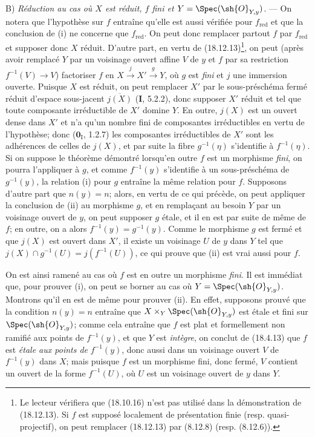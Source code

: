 B) \emph{Réduction au cas où $X$ est réduit, $f$ fini et $Y=\Spec(\sh{O}_{Y,y})$.} --- On notera que l'hypothèse sur $f$ entraîne qu'elle est aussi vérifiée pour $f_{\mathrm{red}}$ et que la conclusion de (i) ne concerne que $f_{\mathrm{red}}$. On peut donc remplacer partout $f$ par $f_{\mathrm{red}}$ et supposer donc $X$ réduit.
D'autre part, en vertu de (18.12.13)\footnote{Le lecteur vérifiera que (18.10.16) n'est pas utilisé dans la démonstration de (18.12.13). Si $f$ est supposé localement de présentation finie (resp. quasi-projectif), on peut remplacer (18.12.13) par (8.12.8) (resp. (8.12.6)).}, on peut (après avoir remplacé $Y$ par un voisinage ouvert affine $V$ de $y$ et $f$ par sa restriction $f^{-1}(V)\to V$) factoriser $f$ en $X\xrightarrow{j}X'\xrightarrow{g}Y$, où $g$ est \emph{fini} et $j$ une immersion ouverte. Puisque $X$ est réduit, on peut remplacer $X'$ par le sous-préschéma fermé réduit d'espace sous-jacent $\overline{j(X)}$ (\textbf{I}, 5.2.2), donc supposer $X'$ réduit et tel que toute composante irréductible de $X'$ domine $Y$. En outre, $j(X)$ est un ouvert dense dans $X'$ et n'a qu'un nombre fini de composantes irréductibles en vertu de l'hypothèse; donc ($\mathbf{0}_{\mathrm I}$, 1.2.7) les composantes irréductibles de $X'$ sont les adhérences de celles de $j(X)$, et par suite la fibre $g^{-1}(\eta)$ s'identifie à $f^{-1}(\eta)$. Si on suppose le théorème démontré lorsqu'en outre $f$ est un morphisme \emph{fini}, on pourra l'appliquer à $g$, et comme $f^{-1}(y)$ s'identifie à un sous-préschéma de $g^{-1}(y)$, la relation (i) pour $g$ entraîne la même relation pour $f$. Supposons d'autre part que $n(y)=n$; alors, en vertu de ce qui précède, on peut appliquer la conclusion de (ii) au morphisme $g$, et en remplaçant au besoin $Y$ par un voisinage ouvert de $y$, on peut supposer $g$ étale, et il en est par suite de même de $f$; en outre, on a alors $f^{-1}(y)=g^{-1}(y)$. Comme le morphisme $g$ est fermé et que $j(X)$ est ouvert dans $X'$, il existe un voisinage $U$ de $y$ dans $Y$ tel que $j(X)\cap g^{-1}(U)=j(f^{-1}(U))$, ce qui prouve que (ii) est vrai aussi pour $f$.

On est ainsi ramené au cas où $f$ est en outre un morphisme \emph{fini}. Il est immédiat que, pour prouver (i), on peut se borner au cas où $Y=\Spec(\sh{O}_{Y,y})$. Montrons qu'il en est de même pour prouver (ii). En effet, supposons prouvé que la condition $n(y)=n$ entraîne que $X\times_Y\Spec(\sh{O}_{Y,y})$ est étale et fini sur $\Spec(\sh{O}_{Y,y})$; comme cela entraîne que $f$ est plat et formellement non ramifié aux points de $f^{-1}(y)$, et que $Y$ est \emph{intègre}, on conclut de (18.4.13) que $f$ est \emph{étale aux points de} $f^{-1}(y)$, donc aussi dans un voisinage ouvert $V$ de $f^{-1}(y)$ dans $X$; mais puisque $f$ est un morphisme fini, donc fermé, $V$ contient un ouvert de la forme $f^{-1}(U)$, où $U$ est un voisinage ouvert de $y$ dans $Y$.


